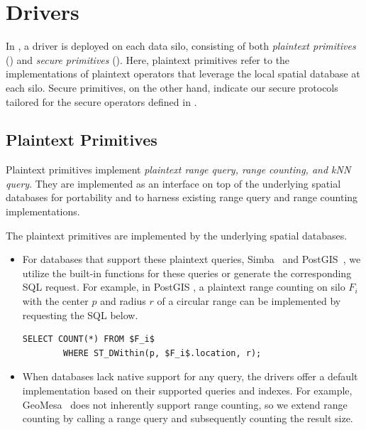 \section{Drivers}
\label{sec:drivers}

In \sysname, a driver is deployed on each data silo, consisting of both \textit{plaintext primitives} () and \textit{secure primitives} ().
Here, plaintext primitives refer to the implementations of plaintext operators that leverage the local spatial database at each silo.
Secure primitives, on the other hand, indicate our secure protocols tailored for the secure operators defined in .


\subsection{Plaintext Primitives}
\label{sec:plaintext-primitives}

Plaintext primitives implement \textit{plaintext range query, range counting, and kNN query}.
They are implemented as an interface on top of the underlying spatial databases for portability and to harness existing range query and range counting implementations.

The plaintext primitives are implemented by the underlying spatial databases.
\begin{itemize}
    \item 
    For databases that support these plaintext queries, \eg Simba~\cite{sigmod16simba} and PostGIS~\cite{postgis}, we utilize the built-in functions for these queries or generate the corresponding SQL request.
    For example, in PostGIS \cite{postgis}, a plaintext range counting on silo $F_i$ with the center $p$ and radius $r$ of a circular range can be implemented by requesting the SQL below.
	\begin{lstlisting}[mathescape,xleftmargin=-8ex]
        SELECT COUNT(*) FROM $F_i$ 
        WHERE ST_DWithin(p, $F_i$.location, r);
    \end{lstlisting}
    
	\item
	When databases lack native support for any query, the drivers offer a default implementation based on their supported queries and indexes. 
	For example, GeoMesa~\cite{ds15geomesa} does not inherently support range counting, so we extend range counting by calling a range query and subsequently counting the result size.
\end{itemize}

